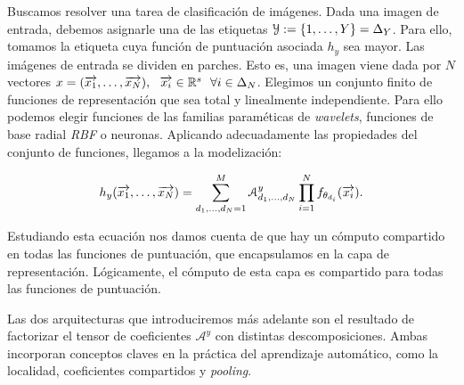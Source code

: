 Buscamos resolver una tarea de clasificación de imágenes. Dada una imagen de entrada, debemos asignarle una de las etiquetas $\mathcal{Y} := \{1, \ldots, Y\} = \Delta_{Y}$. Para ello, tomamos la etiqueta cuya función de puntuación asociada $h_y$ sea mayor. Las imágenes de entrada se dividen en parches. Esto es, una imagen viene dada por $N$ vectores $x = (\overrightarrow{x_1}, \ldots, \overrightarrow{x_N}), \ \  \overrightarrow{x_i} \in \mathbb{R}^s \ \  \forall i \in \Delta_{N}$. Elegimos un conjunto finito de funciones de representación que sea total y linealmente independiente. Para ello podemos elegir funciones de las familias paraméticas de \textit{wavelets}, funciones de base radial \textit{RBF} o neuronas. Aplicando adecuadamente las propiedades del conjunto de funciones, llegamos a la modelización:

\begin{equation}
	h_y(\overrightarrow{x_1}, \ldots, \overrightarrow{x_N}) = \sum_{d_1, \ldots, d_N = 1}^{M} \mathcal{A}^y_{d_1, \ldots, d_N} \prod_{i = 1}^N f_{\theta_{d_i}}(\overrightarrow{x_i}).
\end{equation}

Estudiando esta ecuación nos damos cuenta de que hay un cómputo compartido en todas las funciones de puntuación, que encapsulamos en la capa de representación. Lógicamente, el cómputo de esta capa es compartido para todas las funciones de puntuación.

Las dos arquitecturas que introduciremos más adelante son el resultado de factorizar el tensor de coeficientes $\mathcal{A}^y$ con distintas descomposiciones. Ambas incorporan conceptos claves en la práctica del aprendizaje automático, como la localidad, coeficientes compartidos y \textit{pooling}.
